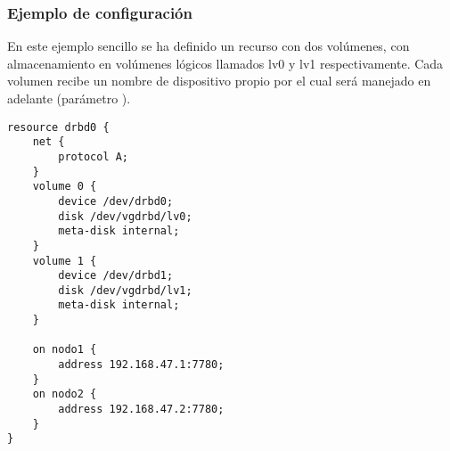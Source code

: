 \subsubsection{Ejemplo de configuración}

En este ejemplo sencillo se ha definido un recurso con dos volúmenes, con almacenamiento en volúmenes lógicos llamados lv0 y lv1 respectivamente. Cada volumen recibe un nombre de dispositivo propio por el cual será manejado en adelante (parámetro ).

\begin{lstlisting}
resource drbd0 {
	net {
		protocol A;
	}
	volume 0 {
		device /dev/drbd0;
		disk /dev/vgdrbd/lv0;
		meta-disk internal;
	}
	volume 1 {
		device /dev/drbd1;
		disk /dev/vgdrbd/lv1;
		meta-disk internal;
	}

	on nodo1 {
		address	192.168.47.1:7780;
	}
	on nodo2 {
		address	192.168.47.2:7780;
	}
}
\end{lstlisting}

